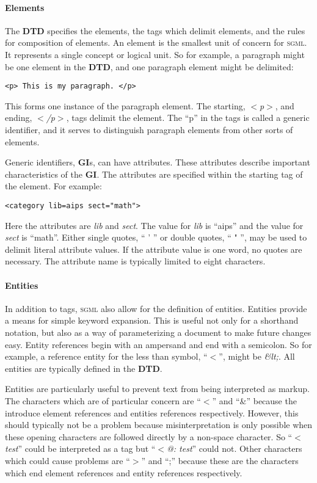 \paragraph{Elements}
The \textbf{DTD} specifies the elements, the tags which delimit elements,
and the rules for composition of elements. An element is the smallest
unit of concern for \textsc{sgml}. It represents a single concept or logical
unit. So for example, a paragraph might be one element in the \textbf{DTD},
and one paragraph element might be delimited:
\begin{verbatim}
<p> This is my paragraph. </p>
\end{verbatim}
\noindent
This forms one instance of the paragraph element. The starting,
\textit{$<$p$>$}, and ending, \textit{$<$/p$>$}, tags delimit the element. The ``p''
in the tags is called a generic identifier, and it serves to distinguish
paragraph elements from other sorts of elements.

Generic identifiers, \textbf{GI}s, can have attributes. These attributes describe 
important characteristics of the \textbf{GI}. The attributes are specified within
the starting tag of the element. For example:
\begin{verbatim}
<category lib=aips sect="math">
\end{verbatim}
\noindent
Here the attributes are \textit{lib} and \textit{sect}. The value for \textit{lib} is
``aips'' and the value for \textit{sect} is ``math''. Either single quotes,
`` ' '' or double quotes, `` " '', may be used to delimit literal attribute 
values. If the attribute value is one word, no quotes are necessary. The
attribute name is typically limited to eight characters.

\paragraph{Entities}
In addition to tags, \textsc{sgml} also allow for the definition of entities.
Entities provide a means for simple keyword expansion. This is useful
not only for a shorthand notation, but also as a way of parameterizing
a document to make future changes easy. Entity references begin with
an ampersand and end with a semicolon. So for example, a reference entity
for the less than symbol, ``$<$'', might be \textit{\&lt;}. All entities are
typically defined in the \textbf{DTD}.

Entities are particularly useful to prevent text from being interpreted as
markup. The characters which are of particular concern are ``$<$'' and ``\&'' 
because the introduce element references and entities references respectively. 
However, this should typically not be a problem because misinterpretation 
is only possible when these opening characters are followed directly by a 
non-space character. So ``\textit{$<$test}'' could be interpreted as a tag but
``\textit{$<$@: test}'' could not. Other characters which could cause problems are
``$>$'' and ``;'' because these are the characters which end element 
references and entity references respectively.

